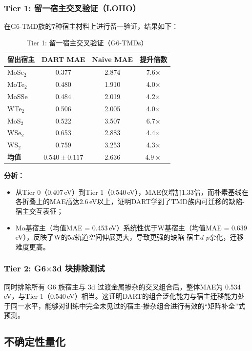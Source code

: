 \subsubsection{Tier 1: 留一宿主交叉验证（LOHO）}

在G6-TMD族的7种宿主材料上进行留一验证，结果如下：

\begin{table}[h]
\centering
\caption{Tier 1: 留一宿主交叉验证（G6-TMDs）}
\begin{tabular}{lccc}
\toprule
\textbf{留出宿主} & \textbf{DART MAE} & \textbf{Naive MAE} & \textbf{提升倍数} \\
\midrule
MoSe$_2$ & 0.377 & 2.874 & 7.6$\times$ \\
MoTe$_2$ & 0.480 & 1.910 & 4.0$\times$ \\
MoSSe & 0.484 & 2.019 & 4.2$\times$ \\
WTe$_2$ & 0.506 & 2.005 & 4.0$\times$ \\
MoS$_2$ & 0.522 & 3.507 & 6.7$\times$ \\
WSe$_2$ & 0.653 & 2.883 & 4.4$\times$ \\
WS$_2$ & 0.759 & 3.253 & 4.3$\times$ \\
\midrule
\textbf{均值} & $\mathbf{0.540 \pm 0.117}$ & 2.636 & $\mathbf{4.9\times}$ \\
\bottomrule
\end{tabular}
\end{table}

\textbf{分析：}
\begin{itemize}
    \item 从Tier 0（0.407\,eV）到Tier 1（0.540\,eV），MAE仅增加1.33倍，而朴素基线在各折叠上的MAE高达2.6\,eV以上，证明DART学到了TMD族内可迁移的缺陷-宿主交互表征；
    \item Mo基宿主（均值MAE = 0.453\,eV）系统性优于W基宿主（均值MAE = 0.639\,eV），反映了W的$5d$轨道空间伸展更大，导致更强的缺陷-宿主$d$-$p$杂化，迁移难度更高。
\end{itemize}

\subsubsection{Tier 2: G6$\times$3d 块排除测试}

同时排除所有 G6 族宿主与 3d 过渡金属掺杂的交叉组合后，整体MAE为 0.534\,eV，与Tier 1（0.540\,eV）相当。这证明DART的组合泛化能力与宿主迁移能力处于同一水平，能够对训练中完全未见过的宿主-掺杂组合进行有效的``矩阵补全''式预测。

\subsection{不确定性量化}


